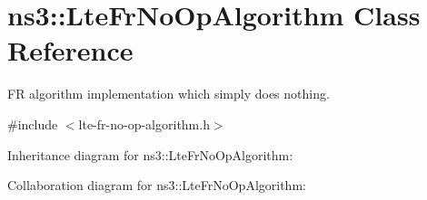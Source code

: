 \hypertarget{classns3_1_1LteFrNoOpAlgorithm}{}\section{ns3\+:\+:Lte\+Fr\+No\+Op\+Algorithm Class Reference}
\label{classns3_1_1LteFrNoOpAlgorithm}


FR algorithm implementation which simply does nothing.  




{\ttfamily \#include $<$lte-\/fr-\/no-\/op-\/algorithm.\+h$>$}



Inheritance diagram for ns3\+:\+:Lte\+Fr\+No\+Op\+Algorithm\+:


Collaboration diagram for ns3\+:\+:Lte\+Fr\+No\+Op\+Algorithm\+:
